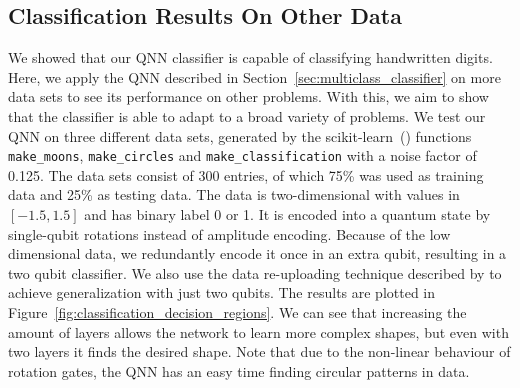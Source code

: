 \documentclass[a4paper,10pt]{article}
\begin{document}
\clearpage

\printbibliography[heading=bibintoc]

\clearpage

\begin{appendices}
\section{Classification Results On Other Data} \label{sec:classification-other}
We showed that our QNN classifier is capable of classifying handwritten digits.
Here, we apply the QNN described in Section~\ref{sec:multiclass_classifier} on more data sets to see its performance on other problems.
With this, we aim to show that the classifier is able to adapt to a broad variety of problems.
We test our QNN on three different data sets, generated by the scikit-learn~(\cite{scikit-learn}) functions \verb|make_moons|, \verb|make_circles| and \verb|make_classification| with a noise factor of 0.125.
The data sets consist of 300 entries, of which 75\% was used as training data and 25\% as testing data.
The data is two-dimensional with values in $[-1.5, 1.5]$ and has binary label 0 or 1.
It is encoded into a quantum state by single-qubit rotations instead of amplitude encoding.
Because of the low dimensional data, we redundantly encode it once in an extra qubit, resulting in a two qubit classifier.
We also use the data re-uploading technique described by \textcite{perez2019data} to achieve generalization with just two qubits.
The results are plotted in Figure~\ref{fig:classification_decision_regions}.
We can see that increasing the amount of layers allows the network to learn more complex shapes, but even with two layers it finds the desired shape.
Note that due to the non-linear behaviour of rotation gates, the QNN has an easy time finding circular patterns in data.


\end{appendices}
\end{document}
